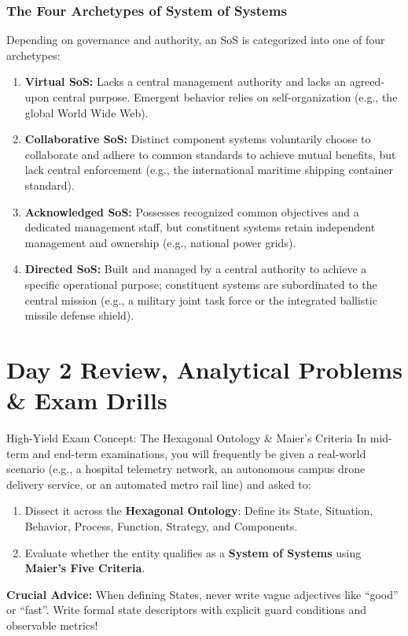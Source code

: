 \subsubsection{The Four Archetypes of System of Systems}
Depending on governance and authority, an SoS is categorized into one of four archetypes:
\begin{enumerate}[leftmargin=1.5em]
    \item \textbf{Virtual SoS:} Lacks a central management authority and lacks an agreed-upon central purpose. Emergent behavior relies on self-organization (e.g., the global World Wide Web).
    \item \textbf{Collaborative SoS:} Distinct component systems voluntarily choose to collaborate and adhere to common standards to achieve mutual benefits, but lack central enforcement (e.g., the international maritime shipping container standard).
    \item \textbf{Acknowledged SoS:} Possesses recognized common objectives and a dedicated management staff, but constituent systems retain independent management and ownership (e.g., national power grids).
    \item \textbf{Directed SoS:} Built and managed by a central authority to achieve a specific operational purpose; constituent systems are subordinated to the central mission (e.g., a military joint task force or the integrated ballistic missile defense shield).
\end{enumerate}

\section{Day 2 Review, Analytical Problems \& Exam Drills}
\label{sec:day2_exercises}

\begin{examprepbox}{High-Yield Exam Concept: The Hexagonal Ontology \& Maier's Criteria}
In mid-term and end-term examinations, you will frequently be given a real-world scenario (e.g., a hospital telemetry network, an autonomous campus drone delivery service, or an automated metro rail line) and asked to:
\begin{enumerate}[leftmargin=1.5em]
    \item Dissect it across the \textbf{Hexagonal Ontology}: Define its State, Situation, Behavior, Process, Function, Strategy, and Components.
    \item Evaluate whether the entity qualifies as a \textbf{System of Systems} using \textbf{Maier's Five Criteria}.
\end{enumerate}
\textbf{Crucial Advice:} When defining States, never write vague adjectives like ``good'' or ``fast''. Write formal state descriptors with explicit guard conditions and observable metrics!
\end{examprepbox}

